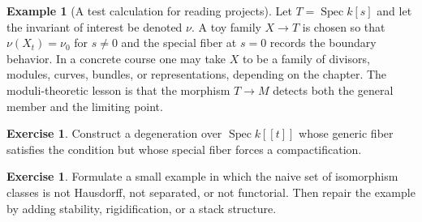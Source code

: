 \documentclass[11pt]{amsart}
\theoremstyle{definition}
\newtheorem{example}[theorem]{Example}
\newtheorem{exercise}[theorem]{Exercise}
\newcommand{\Spec}{\operatorname{Spec}}
\begin{document}
\begin{example}[A test calculation for reading projects]
Let $T=\Spec k[s]$ and let the invariant of interest be denoted $\nu$.  A toy family $X\to T$ is chosen so that $\nu(X_t)=\nu_0$ for $s\ne0$ and the special fiber at $s=0$ records the boundary behavior.  In a concrete course one may take $X$ to be a family of divisors, modules, curves, bundles, or representations, depending on the chapter.  The moduli-theoretic lesson is that the morphism $T\to M$ detects both the general member and the limiting point.
\end{example}
\begin{exercise}
Construct a degeneration over $\Spec k[[t]]$ whose generic fiber satisfies the condition but whose special fiber forces a compactification.
\end{exercise}
\begin{exercise}
Formulate a small example in which the naive set of isomorphism classes is not Hausdorff, not separated, or not functorial.  Then repair the example by adding stability, rigidification, or a stack structure.
\end{exercise}
\clearpage
\end{document}
